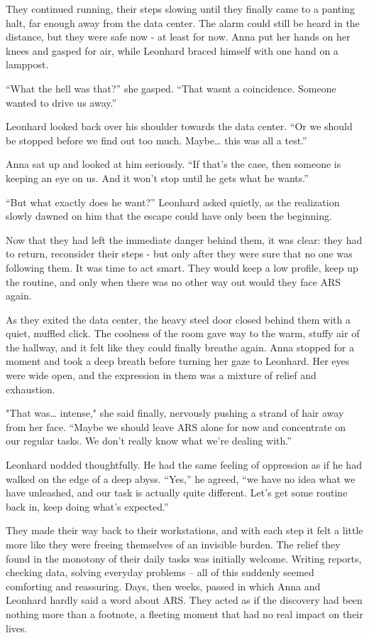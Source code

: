 \documentclass[
]{article}
\begin{document}
They continued running, their steps slowing until they finally came to a
panting halt, far enough away from the data center. The alarm could
still be heard in the distance, but they were safe now - at least for
now. Anna put her hands on her knees and gasped for air, while Leonhard
braced himself with one hand on a lamppost.

``What the hell was that?'' she gasped. ``That wasn\textquotesingle t a
coincidence. Someone wanted to drive us away.''

Leonhard looked back over his shoulder towards the data center. ``Or we
should be stopped before we find out too much. Maybe\ldots{} this was
all a test.''

Anna sat up and looked at him seriously. ``If that's the case, then
someone is keeping an eye on us. And it won't stop until he gets what he
wants.''

``But what exactly does he want?'' Leonhard asked quietly, as the
realization slowly dawned on him that the escape could have only been
the beginning.

Now that they had left the immediate danger behind them, it was clear:
they had to return, reconsider their steps - but only after they were
sure that no one was following them. It was time to act smart. They
would keep a low profile, keep up the routine, and only when there was
no other way out would they face ARS again.

As they exited the data center, the heavy steel door closed behind them
with a quiet, muffled click. The coolness of the room gave way to the
warm, stuffy air of the hallway, and it felt like they could finally
breathe again. Anna stopped for a moment and took a deep breath before
turning her gaze to Leonhard. Her eyes were wide open, and the
expression in them was a mixture of relief and exhaustion.

"That was\ldots{} intense," she said finally, nervously pushing a strand
of hair away from her face. ``Maybe we should leave ARS alone for now
and concentrate on our regular tasks. We don't really know what we're
dealing with.''

Leonhard nodded thoughtfully. He had the same feeling of oppression as
if he had walked on the edge of a deep abyss. ``Yes,'' he agreed, ``we
have no idea what we have unleashed, and our task is actually quite
different. Let's get some routine back in, keep doing what's expected.''

They made their way back to their workstations, and with each step it
felt a little more like they were freeing themselves of an invisible
burden. The relief they found in the monotony of their daily tasks was
initially welcome. Writing reports, checking data, solving everyday
problems -- all of this suddenly seemed comforting and reassuring. Days,
then weeks, passed in which Anna and Leonhard hardly said a word about
ARS. They acted as if the discovery had been nothing more than a
footnote, a fleeting moment that had no real impact on their lives.
\end{document}
